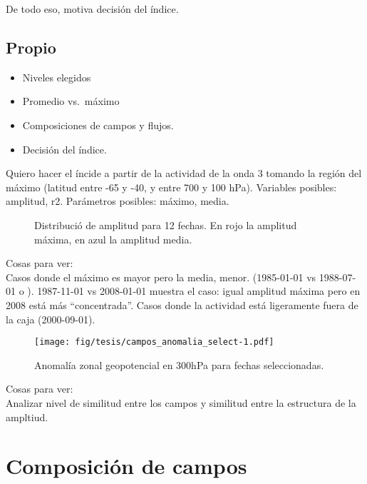 \documentclass[spanish,a4paper]{book}
\providecommand{\tightlist}{%
  \setlength{\itemsep}{0pt}\setlength{\parskip}{0pt}}
\begin{document}
De todo eso, motiva decisión del índice.

\subsection{Propio}\label{propio}

\begin{itemize}
\tightlist
\item
  Niveles elegidos
\item
  Promedio vs.~máximo
\item
  Composiciones de campos y flujos.
\item
  Decisión del índice.
\end{itemize}

Quiero hacer el íncide a partir de la actividad de la onda 3 tomando la
región del máximo (latitud entre -65 y -40, y entre 700 y 100 hPa).
Variables posibles: amplitud, r2. Parámetros posibles: máximo, media.

\begin{figure}

{\centering {}\newline{}

}

\caption{Distribució de amplitud para 12 fechas. En rojo la amplitud máxima, en azul la amplitud media.}\label{fig:max_mean_compara}
\end{figure}

Cosas para ver:\\
Casos donde el máximo es mayor pero la media, menor. (1985-01-01 vs
1988-07-01 o ). 1987-11-01 vs 2008-01-01 muestra el caso: igual amplitud
máxima pero en 2008 está más ``concentrada''. Casos donde la actividad
está ligeramente fuera de la caja (2000-09-01).

\begin{figure}
\centering
\texttt{[image: fig/tesis/campos\_anomalia\_select-1.pdf]}
\caption{Anomalía zonal geopotencial en 300hPa para fechas
seleccionadas.}
\end{figure}

Cosas para ver:\\
Analizar nivel de similitud entre los campos y similitud entre la
estructura de la ampltiud.

\section{Composición de campos}\label{composicion-de-campos}
\end{document}
